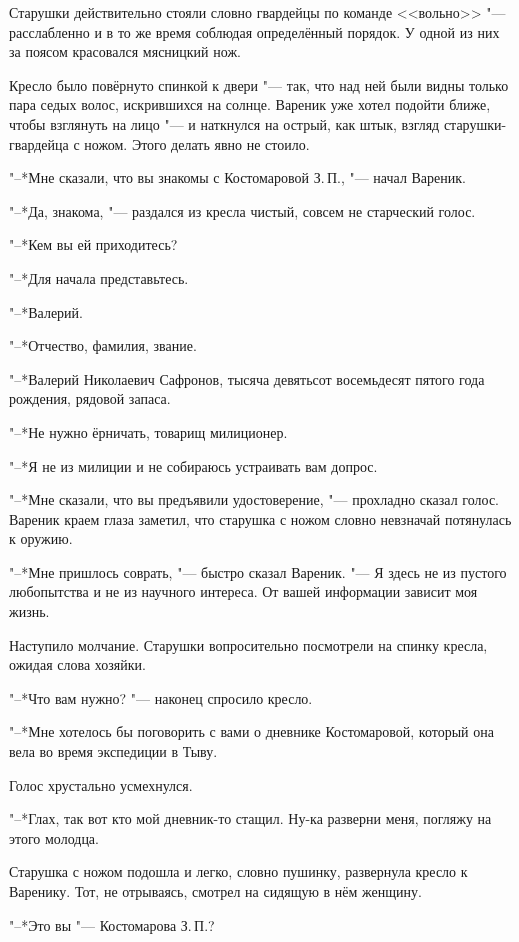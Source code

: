 Старушки действительно стояли словно гвардейцы по команде <<вольно>> "--- расслабленно и в то же время соблюдая определённый порядок.
У одной из них за поясом красовался мясницкий нож.

Кресло было повёрнуто спинкой к двери "--- так, что над ней были видны только пара седых волос, искрившихся на солнце.
Вареник уже хотел подойти ближе, чтобы взглянуть на лицо "--- и наткнулся на острый, как штык, взгляд старушки-гвардейца с ножом.
Этого делать явно не стоило.

"--*Мне сказали, что вы знакомы с Костомаровой З.\,П., "--- начал Вареник.

"--*Да, знакома, "--- раздался из кресла чистый, совсем не старческий голос.

"--*Кем вы ей приходитесь?

"--*Для начала представьтесь.

"--*Валерий.

"--*Отчество, фамилия, звание.

"--*Валерий Николаевич Сафронов, тысяча девятьсот восемьдесят пятого года рождения, рядовой запаса.

"--*Не нужно ёрничать, товарищ милиционер.

"--*Я не из милиции и не собираюсь устраивать вам допрос.

"--*Мне сказали, что вы предъявили удостоверение, "--- прохладно сказал голос.
Вареник краем глаза заметил, что старушка с ножом словно невзначай потянулась к оружию.

"--*Мне пришлось соврать, "--- быстро сказал Вареник.
"--- Я здесь не из пустого любопытства и не из научного интереса.
От вашей информации зависит моя жизнь.

Наступило молчание.
Старушки вопросительно посмотрели на спинку кресла, ожидая слова хозяйки.

"--*Что вам нужно? "--- наконец спросило кресло.

"--*Мне хотелось бы поговорить с вами о дневнике Костомаровой, который она вела во время экспедиции в Тыву.

Голос хрустально усмехнулся.

"--*Глах, так вот кто мой дневник-то стащил.
Ну-ка разверни меня, погляжу на этого молодца.

Старушка с ножом подошла и легко, словно пушинку, развернула кресло к Варенику.
Тот, не отрываясь, смотрел на сидящую в нём женщину.

"--*Это вы "--- Костомарова З.\,П.?

